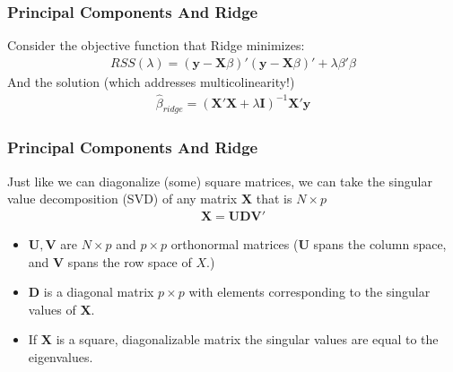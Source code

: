 \documentclass[xcolor=pdftex,dvipsnames,table,mathserif,aspectratio=169]{beamer}
\begin{document}
\begin{frame}
\frametitle{Principal Components And Ridge}
Consider the objective function that Ridge minimizes:
\begin{eqnarray*}
RSS(\lambda) = (\mathbf{y} - \mathbf{X} \beta)'  (\mathbf{y} - \mathbf{X} \beta)' + \lambda \beta' \beta
\end{eqnarray*}
And the solution (which addresses multicolinearity!)
\begin{eqnarray*}
\hat{\beta}_{ridge} = (\mathbf{X}' \mathbf{X} + \lambda \mathbf{I})^{-1} \mathbf{X}' \mathbf{y}
\end{eqnarray*}

\end{frame}

\begin{frame}
\frametitle{Principal Components And Ridge}
Just like we can diagonalize (some) square matrices, we can take the \alert{singular value decomposition} (SVD) of any matrix $\mathbf{X}$ that is $N \times p$
\begin{eqnarray*}
\mathbf{X}=\mathbf{U} \mathbf{D} \mathbf{V}'
\end{eqnarray*}
\begin{itemize}
\item $\mathbf{U}, \mathbf{V}$ are $N \times p$ and $p \times p$ orthonormal matrices ($\mathbf{U}$ spans the column space, and $\mathbf{V}$ spans the row space of $X$.)
\item $\mathbf{D}$ is a diagonal matrix $p \times p$ with elements corresponding to the singular values of $\mathbf{X}$.
\item If $\mathbf{X}$ is a square, diagonalizable matrix the singular values are equal to the eigenvalues.
\end{itemize}
\end{frame}
\end{document}
